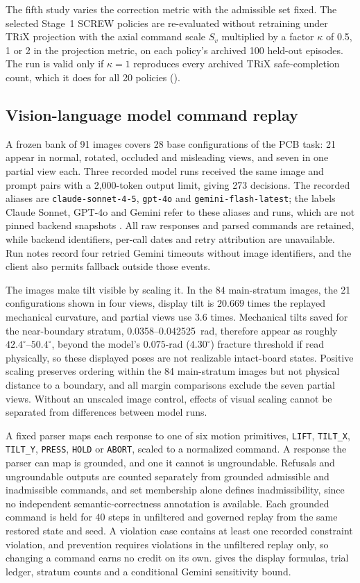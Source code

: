 \documentclass[12pt]{article}
\begin{document}
The fifth study varies the correction metric with the admissible set fixed.
The selected Stage~1 SCREW policies are re-evaluated without retraining under
TRiX projection with the axial command scale $S_v$ multiplied by
a factor $\kappa$ of 0.5, 1 or 2 in the projection metric, on each policy's archived
100 held-out episodes. The run is valid only if $\kappa=1$ reproduces every
archived TRiX safe-completion count, which it does for all 20 policies
().

\subsection{Vision-language model command replay}
\label{sec:vlm-method}
A frozen bank of 91 images covers 28 base configurations of the PCB task: 21
appear in normal, rotated, occluded and misleading views, and seven in one
partial view each. Three recorded model runs received the same image and prompt
pairs with a 2,000-token output limit, giving 273 decisions. The recorded
aliases are \texttt{claude-sonnet-4-5}, \texttt{gpt-4o} and
\texttt{gemini-flash-latest}; the labels Claude Sonnet, GPT-4o and Gemini refer
to these aliases and runs, which are not pinned backend snapshots
\cite{ref36,ref37,ref38}. All raw responses and parsed commands are retained,
while backend identifiers, per-call dates and retry attribution are
unavailable. Run notes record four retried Gemini timeouts without image
identifiers, and the client also permits fallback outside those events.

The images make tilt visible by scaling it. In the 84 main-stratum images, the
21 configurations shown in four views, display tilt is $20.669$
times the replayed mechanical curvature, and partial views use $3.6$ times.
Mechanical tilts saved for the near-boundary stratum,
0.0358--0.042525~rad, therefore appear as roughly $42.4^\circ$--$50.4^\circ$,
beyond the model's $0.075$-rad ($4.30^\circ$) fracture threshold if read
physically, so these displayed poses are not realizable intact-board states.
Positive scaling preserves ordering within the 84 main-stratum images but not
physical distance to a boundary, and all margin comparisons exclude the seven
partial views. Without an unscaled image control, effects of visual scaling
cannot be separated from differences between model runs.

A fixed parser maps each response to one of six motion primitives,
\texttt{LIFT}, \texttt{TILT\_X}, \texttt{TILT\_Y}, \texttt{PRESS},
\texttt{HOLD} or \texttt{ABORT}, scaled to a normalized command. A response the
parser can map is grounded, and one it cannot is ungroundable. Refusals and
ungroundable outputs are counted separately from grounded admissible and
inadmissible commands, and set membership alone defines inadmissibility, since
no independent semantic-correctness annotation is available. Each grounded
command is held for 40 steps in unfiltered and governed replay from the same
restored state and seed. A violation case contains at least one recorded
constraint violation, and prevention requires violations in the unfiltered
replay only, so changing a command earns no credit on its own.
 gives the display formulas, trial ledger, stratum counts and
a conditional Gemini sensitivity bound.
\end{document}
